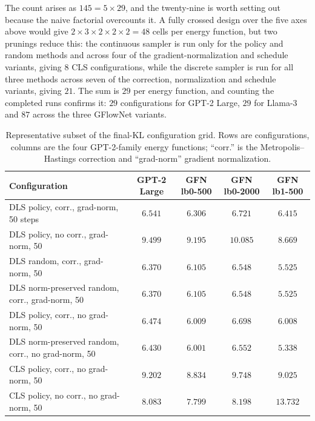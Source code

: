 The count arises as $145 = 5 \times 29$, and the twenty-nine is worth setting out because the naive factorial overcounts it. A fully crossed design over the five axes above would give $2 \times 3 \times 2 \times 2 \times 2 = 48$ cells per energy function, but two prunings reduce this: the continuous sampler is run only for the policy and random methods and across four of the gradient-normalization and schedule variants, giving $8$ CLS configurations, while the discrete sampler is run for all three methods across seven of the correction, normalization and schedule variants, giving $21$. The sum is $29$ per energy function, and counting the completed runs confirms it: $29$ configurations for GPT-2 Large, $29$ for Llama-3 and $87$ across the three GFlowNet variants.

\begin{table}[htbp]
    \centering
    \scriptsize
    \setlength{\tabcolsep}{4pt}
    \begin{tabular}{lcccc}
        \toprule
        Configuration & GPT-2 Large & GFN lb0-500 & GFN lb0-2000 & GFN lb1-500 \\
        \midrule
        DLS policy, corr., grad-norm, 50 steps & $6.541$ & $6.306$ & $6.721$ & $6.415$ \\
        DLS policy, no corr., grad-norm, 50 & $9.499$ & $9.195$ & $10.085$ & $8.669$ \\
        DLS random, corr., grad-norm, 50 & $6.370$ & $6.105$ & $6.548$ & $5.525$ \\
        DLS norm-preserved random, corr., grad-norm, 50 & $6.370$ & $6.105$ & $6.548$ & $5.525$ \\
        DLS policy, corr., no grad-norm, 50 & $6.474$ & $6.009$ & $6.698$ & $6.008$ \\
        DLS norm-preserved random, corr., no grad-norm, 50 & $6.430$ & $6.001$ & $6.552$ & $5.338$ \\
        CLS policy, corr., no grad-norm, 50 & $9.202$ & $8.834$ & $9.748$ & $9.025$ \\
        CLS policy, no corr., no grad-norm, 50 & $8.083$ & $7.799$ & $8.198$ & $13.732$ \\
        \bottomrule
    \end{tabular}
    \caption[Representative subset of the final-KL configuration grid.]{Representative subset of the final-KL configuration grid. Rows are configurations, columns are the four GPT-2-family energy functions; ``corr.'' is the Metropolis--Hastings correction and ``grad-norm'' gradient normalization.}
    \label{tab:full-grid}
\end{table}

